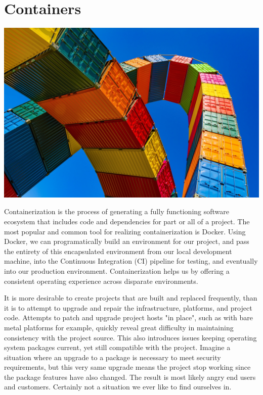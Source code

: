 \chapter{Containers}

\includegraphics[scale=0.85]{../images/container-4203677_1920.jpg}

\justify
Containerization is the process of generating a fully functioning
software ecosystem that includes code and dependencies for part or all
of a project. The most popular and common tool for realizing
containerization is Docker. Using Docker, we can programatically build
an environment for our project, and pass the entirety of this
encapsulated environment from our local development machine, into the
Continuous Integration (CI) pipeline for testing, and eventually into
our production environment. Containerization helps us by offering a
consistent operating experience across disparate environments.

\justify
It is more desirable to create projects that are built and replaced
frequently, than it is to attempt to upgrade and repair the
infrastructure, platforms, and project code. Attempts to patch and
upgrade project hosts "in place", such as with bare metal platforms for
example, quickly reveal great difficulty in maintaining consistency with
the project source. This also introduces issues keeping operating system
packages current, yet still compatible with the project. Imagine a
situation where an upgrade to a package is necessary to meet security
requirements, but this very same upgrade means the project stop working
since the package features have also changed. The result is most likely
angry end users and customers. Certainly not a situation we ever like to
find ourselves in.

